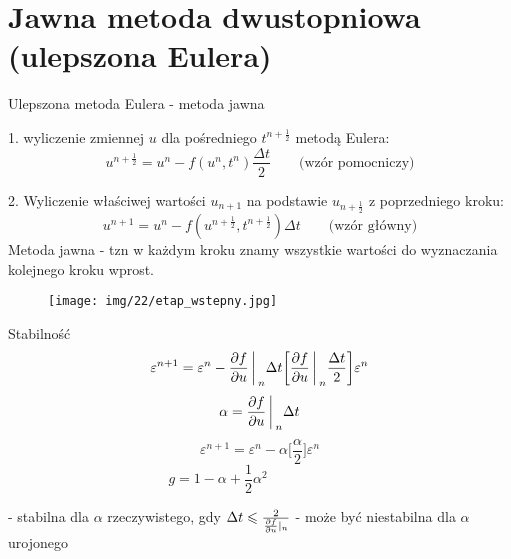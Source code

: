 \section{Jawna metoda dwustopniowa (ulepszona Eulera)}
\begin{frame}{Ulepszona metoda Eulera - metoda jawna}

	1. wyliczenie zmiennej $u$ dla pośredniego $t^{n+\frac{1}{2}}$ metodą Eulera:
    $$u^{n+\frac{1}{2}} = u^n - f(u^n,t^n)\frac{\Delta t}{2} \qquad \text{(wzór pomocniczy)}$$
    
    2. Wyliczenie właściwej wartości $u_{n+1}$ na podstawie $u_{n+\frac{1}{2}}$ z poprzedniego kroku:    
    $$u^{n+1} = u^n - f(u^{n+\frac{1}{2}},t^{n+\frac{1}{2}})\Delta t \qquad \text{(wzór główny)}$$
Metoda jawna - tzn w każdym kroku znamy wszystkie wartości do wyznaczania kolejnego kroku wprost.
\end{frame}
\begin{frame}
	 \begin{figure}
	\texttt{[image: img/22/etap\_wstepny.jpg]}
	\end{figure}
\end{frame}
\begin{frame}{Stabilność}
	$$\varepsilon^{n+1} = \varepsilon^n - \frac{\partial f}{\partial u}\bigg\arrowvert_n\Delta t\bigg[\frac{\partial f}{\partial u} \bigg\arrowvert_n\frac{\Delta t}{2}\bigg]\varepsilon^n$$
    $$\alpha = \frac{\partial f}{\partial u}\bigg\arrowvert_n \Delta t$$
    $$
    \varepsilon^{n+1} = \varepsilon^n - \alpha\bigg[  \frac{\alpha}{2} \bigg]\varepsilon^n
     $$
     $$g = 1-\alpha +\frac{1}{2}\alpha^2 \qquad \qquad \qquad 
     $$
    
    \newline
    - stabilna dla $\alpha$ rzeczywistego, gdy $\Delta t \leqslant \frac{2}{\frac{\partial f}{\partial u}\arrowvert_n}$
    \newline
    - może być niestabilna dla $\alpha$ urojonego
\end{frame}
